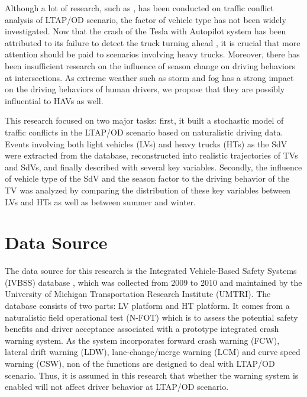 \documentclass[letterpaper, 10 pt, conference]{ieeeconf}
\begin{document}
%
%
Although a lot of research, such as \cite{Chan2006a,Nobukawa2009b}, has been conducted on traffic conflict analysis of LTAP/OD scenario, the factor of vehicle type has not been widely investigated. Now that the crash of the Tesla with Autopilot system has been attributed to its failure to detect the truck turning ahead \cite{2016PreliminaryHwy16Fh018}, it is crucial that more attention should be paid to scenarios involving heavy trucks. Moreover, there has been insufficient research on the influence of season change on driving behaviors at intersections. As extreme weather such as storm and fog has a strong impact on the driving behaviors of human drivers, we propose that they are possibly influential to HAVs as well.

This research focused on two major tasks: first, it built a stochastic model of traffic conflicts in the LTAP/OD scenario based on naturalistic driving data. Events involving both light vehicles (LVs) and heavy trucks (HTs) as the SdV were extracted from the database, reconstructed into realistic trajectories of TVs and SdVs, and finally described with several key variables. Secondly, the influence of vehicle type of the SdV and the season factor to the driving behavior of the TV was analyzed by comparing the distribution of these key variables between LVs and HTs as well as between summer and winter. 
\section{Data Source}
The data source for this research is the Integrated Vehicle-Based Safety Systems (IVBSS) database \cite{Leblanc2011a}, which was collected from 2009 to 2010 and maintained by the University of Michigan Transportation Research Institute (UMTRI). The database consists of two parts: LV platform and HT platform. It comes from a naturalistic field operational test (N-FOT) which is to assess the potential safety benefits and driver acceptance associated with a prototype integrated crash warning system\cite{Sayer2010,JamesR.SayerScottE.BogardDillonFunkhouserDavidJ.LeBlancShanBaoAdamD.BlankespoorMaryLynnBuonarosa2010}. As the system incorporates forward crash warning (FCW), lateral drift warning (LDW), lane-change/merge warning (LCM) and curve speed warning (CSW), non of the functions are designed to deal with LTAP/OD scenario. Thus, it is assumed in this research that whether the warning system is enabled will not affect driver behavior at LTAP/OD scenario. 
\end{document}
